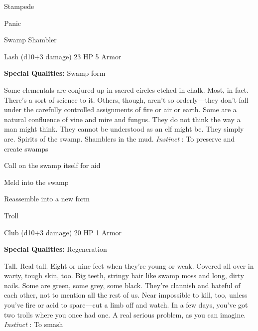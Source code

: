 \startitemize[1,packed]
         
\item Stampede

         
\item Panic

       
\stopitemize
       
\startMonsterName
Swamp Shambler	 
\stopMonsterName
       

Lash (d10+3 damage)	23 HP	5 Armor

       


       
\startMonsterQualities
         {\bf Special Qualities:}  Swamp form
\stopMonsterQualities
       
\startMonsterDescription
Some elementals are conjured up in sacred circles etched in chalk. Most, in fact. There’s a sort of science to it. Others, though, aren’t so orderly—they don’t fall under the carefully controlled assignments of fire or air or earth. Some are a natural confluence of vine and mire and fungus. They do not think the way a man might think. They cannot be understood as an elf might be. They simply are. Spirits of the swamp. Shamblers in the mud. {\em Instinct} : To preserve and create swamps
\stopMonsterDescription
       
\startitemize[1,packed]
         
\item Call on the swamp itself for aid

         
\item Meld into the swamp

         
\item Reassemble into a new form

       
\stopitemize
       
\startMonsterName
Troll	 
\stopMonsterName
       

Club (d10+3 damage)	20 HP	1 Armor

       


       
\startMonsterQualities
         {\bf Special Qualities:}  Regeneration
\stopMonsterQualities
       
\startMonsterDescription
Tall. Real tall. Eight or nine feet when they’re young or weak. Covered all over in warty, tough skin, too. Big teeth, stringy hair like swamp moss and long, dirty nails. Some are green, some grey, some black. They’re clannish and hateful of each other, not to mention all the rest of us. Near impossible to kill, too, unless you’ve fire or acid to spare—cut a limb off and watch. In a few days, you’ve got two trolls where you once had one. A real serious problem, as you can imagine. {\em Instinct} : To smash
\stopMonsterDescription
       

